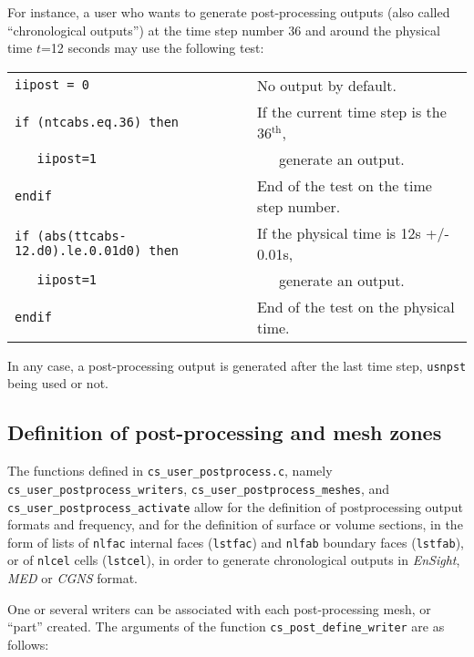 {{{For instance, a user who wants to generate post-processing outputs (also
called ``chronological outputs'') at
the time step number 36 and around the physical time $t$=12 seconds may
use the following test:\\

\begin{tabular}{ll}
\mbox{\texttt{iipost = 0}}
                    & No output by default. \\
\mbox{\texttt{if (ntcabs.eq.36) then}}
                    & If the current time step is the 36$^{\text{th}}$,\\
\mbox{\texttt{~~~iipost=1}}
                    & ~~~generate an output. \\
\mbox{\texttt{endif}}
                    & End of the test on the time step number. \\
\mbox{\texttt{if (abs(ttcabs-12.d0).le.0.01d0) then}}
                    & If the physical time is 12s +/- 0.01s,\\
\mbox{\texttt{~~~iipost=1}}
                    & ~~~generate an output. \\
\mbox{\texttt{endif}}
                    & End of the test on the physical time. \\
\end{tabular}

In any case, a post-processing output is generated after the last time
step, \texttt{usnpst} being used or not.

\newpage
\subsection{Definition of post-processing and mesh zones}

The functions defined in \texttt{cs\_user\_postprocess.c}, namely
\texttt{cs\_user\_postprocess\_writers}, \texttt{cs\_user\_postprocess\_meshes},
and \texttt{cs\_user\_postprocess\_activate} allow for
the definition of postprocessing output formats and frequency, and
for the definition of  surface or volume sections, in the form
of lists of \texttt{nlfac} internal faces (\texttt{lstfac}) and
\texttt{nlfab} boundary faces (\texttt{lstfab}),
or of \texttt{nlcel} cells (\texttt{lstcel}), in order to generate
chronological outputs in {\em EnSight}, {\em MED} or {\em CGNS} format.

One or several writers can be associated with each post-processing
mesh, or ``part'' created. The arguments of the function
\texttt{cs\_post\_define\_writer} are as follows:

}}}
